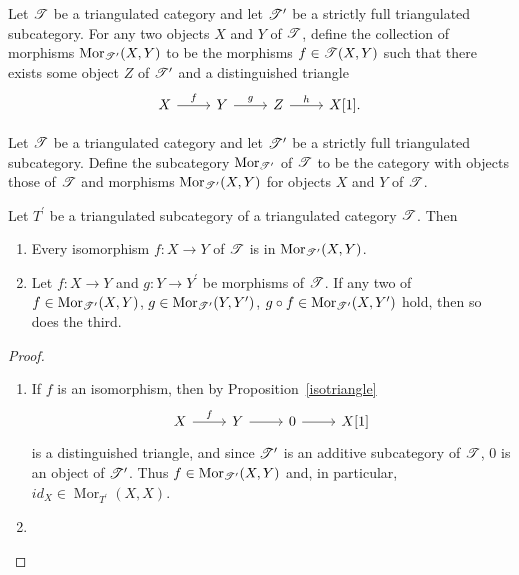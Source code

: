 \documentclass[dissertation.tex]{subfiles}
\begin{document}
\begin{defn}
  Let $\mathscr{T}$ be a triangulated category and let $\mathscr{T}^\prime$ be a strictly full triangulated subcategory.
  For any two objects $X$ and $Y$ of $\mathscr{T}$, define the collection of morphisms $\operatorname{Mor}_{\mathscr{T}^\prime}(X,Y)$ to be the morphisms $f \in \mathscr{T}(X,Y)$ such that there exists some object $Z$ of $\mathscr{T}^\prime$ and a distinguished triangle
  $$\begin{tikzcd}
    X \arrow{r}{f} & Y \arrow{r}{g} & Z \arrow{r}{h} & X[1].
  \end{tikzcd}$$
\end{defn}

\begin{defn}
  Let $\mathscr{T}$ be a triangulated category and let $\mathscr{T}^\prime$ be a strictly full triangulated subcategory.
  Define the subcategory $\operatorname{Mor}_{\mathscr{T}^\prime}$ of $\mathscr{T}$ to be the category with objects those of $\mathscr{T}$ and morphisms $\operatorname{Mor}_{\mathscr{T}^\prime}(X,Y)$ for objects $X$ and $Y$ of $\mathscr{T}$.
\end{defn}

\begin{lem}
  Let $T^\prime$ be a triangulated subcategory of a triangulated category $\mathscr{T}$.
  Then
  \begin{enumerate}
    \item
      Every isomorphism $f : X \rightarrow Y$ of $\mathscr{T}$ is in $\operatorname{Mor}_{\mathscr{T}^\prime}(X,Y)$.
    \item
      Let $f : X \rightarrow Y$ and $g : Y \rightarrow Y^\prime$ be morphisms of $\mathscr{T}$.
      If any two of 
      $f \in \operatorname{Mor}_{\mathscr{T}^\prime}(X,Y)$,
      $g \in \operatorname{Mor}_{\mathscr{T}^\prime}(Y,Y^\prime)$,
      $g \circ f \in \operatorname{Mor}_{\mathscr{T}^\prime}(X,Y^\prime)$
      hold, then so does the third. 
  \end{enumerate}
  
  \begin{proof}
    \begin{enumerate}
    \item
      If $f$ is an isomorphism, then by Proposition~\ref{isotriangle}
      $$\begin{tikzcd}
        X \arrow{r}{f} & Y \arrow{r} & 0 \arrow{r} & X[1]
      \end{tikzcd}$$
      is a distinguished triangle, and since $\mathscr{T}^\prime$ is an additive subcategory of $\mathscr{T}$, $0$ is an object of $\mathscr{T}^\prime$.
      Thus $f \in \operatorname{Mor}_{\mathscr{T}^\prime}(X,Y)$ and, in particular, $id_X \in \operatorname{Mor}_{T^\prime}(X,X)$.
    \item
      
    \end{enumerate}
  \end{proof}
\end{lem}
\end{document}
